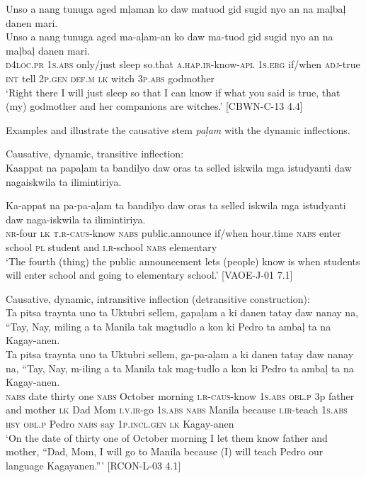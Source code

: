 \ea
Unso	a	nang	tunuga	aged	mļaman	ko	daw	matuod gid	sugid	nyo	an	na	maļbaļ	danen	mari. \\\smallskip
\gll Unso	a	nang	tunuga	aged	ma-aļam-an	ko	daw	ma-tuod gid	sugid	nyo	an	na	maļbaļ	danen	mari. \\
\textsc{d4loc.pr}	1\textsc{s.abs}	only/just	sleep	so.that	\textsc{a.hap.ir}-know-\textsc{apl}	1\textsc{s.erg}	if/when	\textsc{adj}-true	\textsc{int}	 tell
2\textsc{p.gen}	\textsc{def.m}	\textsc{lk}	witch	3\textsc{p.abs}	godmother \\
\glt ‘Right there I will just sleep	so that I can know if what you said is true, that (my) godmother and her companions are witches.’ [CBWN-C-13 4.4]
\z

Examples  and  illustrate the causative stem \textit{paļam} with the dynamic inflections.

\ea
\label{ex:toelementaryschool}
Causative, dynamic, transitive inflection: \\
Kaappat	na	papaļam	ta	bandilyo	daw	oras	ta	selled iskwila 	mga	istudyanti	daw	nagaiskwila	ta	ilimintiriya. \\\smallskip

\gll Ka-appat	na	pa-pa-aļam	ta	bandilyo	daw	oras	ta	selled iskwila 	mga	istudyanti	daw	naga-iskwila\footnotemark{}	ta	ilimintiriya. \\
\textsc{nr}-four	\textsc{lk}	\textsc{t.r}-\textsc{caus}-know	\textsc{nabs} 	public.announce	if/when	hour.time	\textsc{nabs}	enter	school \textsc{pl}	student	and	\textsc{i.r}-school	\textsc{nabs}	elementary\\
\glt ‘The fourth (thing) the public announcement lets (people) know is when students will enter school and going to elementary school.’ [VAOE-J-01 7.1]
\z

\ea
\label{ex:thelanguageofkagayanen}
Causative, dynamic, intransitive inflection (detransitive construction): \\
Ta	pitsa	traynta	uno	ta	Uktubri	sellem,	gapaļam	a ki	danen	tatay	daw	nanay	na,	“Tay,	Nay,	miling	a	ta	Manila tak	magtudlo	a	kon	ki	Pedro	ta	ambaļ	ta	na	Kagay-anen. \\\smallskip
\gll Ta	pitsa	traynta	uno	ta	Uktubri	sellem,	ga-pa-aļam	a ki	danen	tatay	daw	nanay	na,	“Tay,	Nay,	m-iling	a	ta	Manila tak	mag-tudlo	a	kon	ki	Pedro	ta	ambaļ	ta	na	Kagay-anen. \\
\textsc{nabs}	date	thirty	one	\textsc{nabs}	October	morning	\textsc{i.r-caus}-know	1\textsc{s.abs}
\textsc{obl.p}	3p	father	and	mother	\textsc{lk}	Dad	Mom	\textsc{i.v.ir}-go	1\textsc{s.abs}	\textsc{nabs}	Manila
because	\textsc{i.ir}-teach	1\textsc{s.abs}	\textsc{hsy}	\textsc{obl.p}	Pedro	\textsc{nabs}		say	1\textsc{p.incl.gen}	\textsc{lk}	Kagay-anen \\
\glt ‘On the date of thirty one of October morning I let them know father and mother, “Dad, Mom, I will go to Manila because (I) will teach Pedro our language Kagayanen.”’ [RCON-L-03 4.1]
\z

